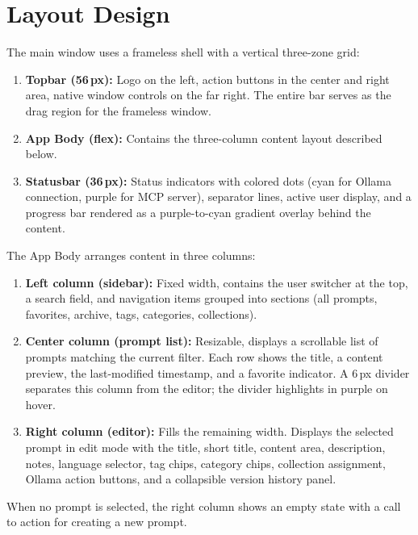 \documentclass[a4paper, 11pt, oneside]{report}
\begin{document}
\section{Layout Design}
\label{sec:layout}

The main window uses a frameless shell with a vertical three-zone grid:

\begin{enumerate}
  \item \textbf{Topbar (56\,px):} Logo on the left, action buttons in the
        center and right area, native window controls on the far right.
        The entire bar serves as the drag region for the frameless window.
  \item \textbf{App Body (flex):} Contains the three-column content layout
        described below.
  \item \textbf{Statusbar (36\,px):} Status indicators with colored dots
        (cyan for Ollama connection, purple for MCP server), separator
        lines, active user display, and a progress bar rendered as a
        purple-to-cyan gradient overlay behind the content.
\end{enumerate}

The App Body arranges content in three columns:

\begin{enumerate}
  \item \textbf{Left column (sidebar):} Fixed width, contains the user
        switcher at the top, a search field, and navigation items grouped
        into sections (all prompts, favorites, archive, tags, categories,
        collections).
  \item \textbf{Center column (prompt list):} Resizable, displays a
        scrollable list of prompts matching the current filter.  Each row
        shows the title, a content preview, the last-modified timestamp,
        and a favorite indicator.  A 6\,px divider separates this column
        from the editor; the divider highlights in purple on hover.
  \item \textbf{Right column (editor):} Fills the remaining width.
        Displays the selected prompt in edit mode with the title, short
        title, content area, description, notes, language selector, tag
        chips, category chips, collection assignment, Ollama action
        buttons, and a collapsible version history panel.
\end{enumerate}

When no prompt is selected, the right column shows an empty state with a
call to action for creating a new prompt.
\end{document}
